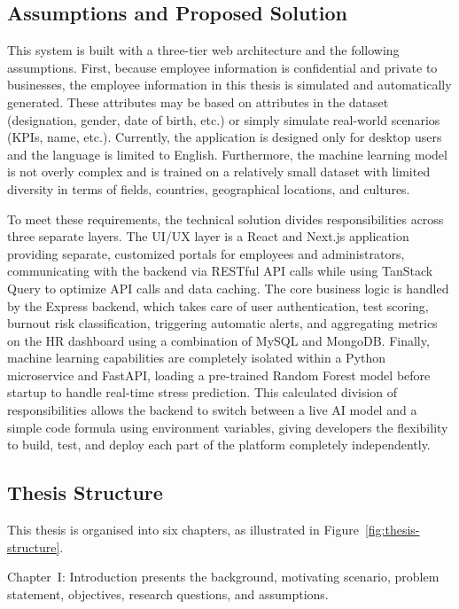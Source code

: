 \documentclass[12pt,a4paper]{article}
\begin{document}
\subsection{Assumptions and Proposed Solution}

This system is built with a three-tier web architecture and the following assumptions. First, because employee information is confidential and private to businesses, the employee information in this thesis is simulated and automatically generated. These attributes may be based on attributes in the dataset (designation, gender, date of birth, etc.) or simply simulate real-world scenarios (KPIs, name, etc.). Currently, the application is designed only for desktop users and the language is limited to English. Furthermore, the machine learning model is not overly complex and is trained on a relatively small dataset with limited diversity in terms of fields, countries, geographical locations, and cultures.

To meet these requirements, the technical solution divides responsibilities across three separate layers. The UI/UX layer is a React and Next.js application providing separate, customized portals for employees and administrators, communicating with the backend via RESTful API calls while using TanStack Query to optimize API calls and data caching. The core business logic is handled by the Express backend, which takes care of user authentication, test scoring, burnout risk classification, triggering automatic alerts, and aggregating metrics on the HR dashboard using a combination of MySQL and MongoDB. Finally, machine learning capabilities are completely isolated within a Python microservice and FastAPI, loading a pre-trained Random Forest model before startup to handle real-time stress prediction. This calculated division of responsibilities allows the backend to switch between a live AI model and a simple code formula using environment variables, giving developers the flexibility to build, test, and deploy each part of the platform completely independently.

\subsection{Thesis Structure}

This thesis is organised into six chapters, as illustrated in
Figure~\ref{fig:thesis-structure}.

Chapter~I: Introduction presents the background, motivating
scenario, problem statement, objectives, research questions, and
assumptions.
\end{document}
